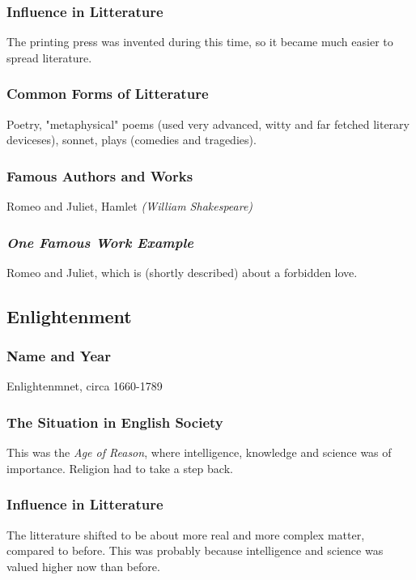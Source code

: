 \subsubsection{Influence in Litterature}
The printing press was invented during this time, so it became much easier to spread literature.

\subsubsection{Common Forms of Litterature}
Poetry, "metaphysical" poems (used very advanced, witty and far fetched literary deviceses), sonnet, plays (comedies and tragedies).

\subsubsection{Famous Authors and Works}
Romeo and Juliet, Hamlet \textit{(William Shakespeare)}

\subsubsection{\textit{One Famous Work Example}}
Romeo and Juliet, which is (shortly described) about a forbidden love.

\newpage
\subsection{Enlightenment}

\subsubsection{Name and Year}
Enlightenmnet, circa 1660-1789

\subsubsection{The Situation in English Society}
This was the \textit{Age of Reason}, where intelligence, knowledge and science was of importance. Religion had to take a step back.

\subsubsection{Influence in Litterature}
The litterature shifted to be about more real and more complex matter, compared to before. This was probably because intelligence and science was valued higher now than before.

